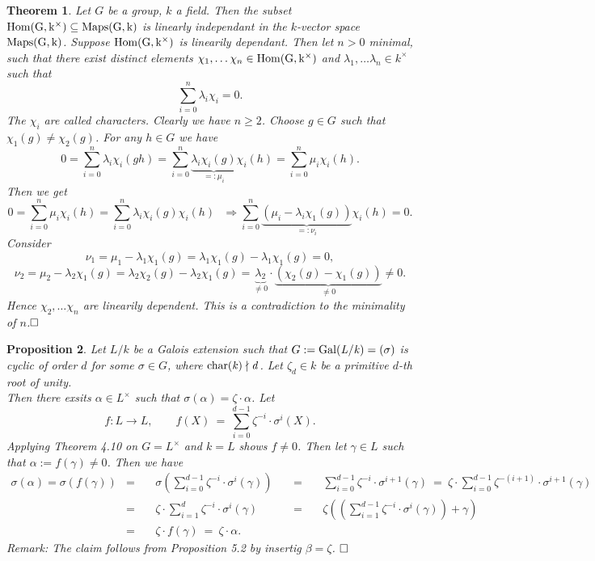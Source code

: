\documentclass[11pt]{book}
\newtheorem{theorem}{Theorem}[section]
\newtheorem{proposition}[theorem]{Proposition}
\theoremstyle{nonumberbreak}
\newenvironment{pr}[1][]{\ifthenelse{\equal{#1}{}}{\proof}{\proof[#1]}\rm}{\endproof}
\begin{document}
\begin{spacing}{1.3}
\begin{theorem} %
Let $G$ be a group, $k$ a field. Then the subset $\rm{Hom}(G,k^{\times}) \subseteq \rm{Maps}(G,k)$ is linearly independant in the $k$-vector space $\rm{Maps}(G,k)$. 
\begin{pr}
Suppose $\rm{Hom}(G,k^{\times})$ is linearily dependant. Then let $n>0$ minimal, such that there exist distinct elements $\chi_1, \dots \chi_n \in \rm{Hom}(G,k^{\times})$ and $\lambda_1, \dots \lambda_n \in k^{\times}$ such that
$$ \sum_{i=0}^n \lambda_i \chi_i =0.$$
The $\chi_i$ are called \textit{characters}. Clearly we have $n \geqslant 2$. Choose $g \in G$ such that $\chi_1(g) \neq \chi_2(g)$.
For any $h \in G$ we have
$$0 = \sum_{i=0}^n \lambda_i \chi_i (gh)= \sum_{i=0}^n \underbrace{\lambda_i \chi_i(g)}_{=:\mu_i} \chi_i(h)=\sum_{i=0}^n \mu_i \chi_i(h).$$
Then we get 
$$0 =\sum_{i=0}^n \mu_i \chi_i(h)= \sum_{i=0}^n \lambda_i \chi_i(g)\chi_i(h) \textrm{ } \Rightarrow \sum_{i=0}^n \underbrace{\left(\mu_i-\lambda_i \chi_1(g)\right)}_{=:\nu_i}\chi_i(h)=0.$$
Consider
$$\nu_1=\mu_1-\lambda_1 \chi_1(g)=\lambda_1 \chi_1(g)-\lambda_1 \chi_1(g)=0,$$
$$\nu_2=\mu_2-\lambda_2 \chi_1(g)=\lambda_2 \chi_2(g)-\lambda_2 \chi_1(g)=\underbrace{\lambda_2}_{\neq 0} \cdot \underbrace{\left(\chi_2(g)-\chi_1(g)\right)}_{\neq 0} \neq 0.$$
Hence $\chi_2, \dots \chi_n$ are linearily dependent. This is a contradiction to the minimality of $n$.$\hfill \Box$
\end{pr}
\end{theorem}


\begin{proposition} %
Let $L/k$ be a Galois extension such that $G:= \rm{Gal}\it(L/k)=( \sigma )$ is cyclic of order $d$ for some $\sigma \in G$, where $\rm{char}\it(k) \nmid d$. Let $\zeta_d \in k$ be a primitive $d$-th root of unity.\\
Then there exsits $\alpha \in L^{\times}$ such that $\sigma(\alpha)=\zeta \cdot \alpha$.
\begin{pr}
Let $$f:L \longrightarrow L, \qquad f(X)\ =\ \sum_{i=0}^{d-1} \zeta^{-i} \cdot \sigma^{i}(X).$$
Applying Theorem 4.10 on $G=L^{\times}$ and $k=L$ shows $f\neq 0$.
Then let $\gamma \in L$ such that $\alpha:=f(\gamma) \neq 0$. Then we have
\begin{alignat*}{13}
\sigma(\alpha)=\sigma \left(f(\gamma)\right) &=&& \ \sigma \left(\sum_{i=0}^{d-1} \zeta^{-i} \cdot \sigma^{i}(\gamma)\right) \ &&=&&\ \sum_{i=0}^{d-1} \zeta^{-i} \cdot \sigma^{i+1}(\gamma)\ =\ \zeta \cdot \sum_{i=0}^{d-1}\zeta^{-(i+1)}\cdot \sigma^{i+1}(\gamma)\\
&= && \ \zeta \cdot \sum_{i=1}^d \zeta^{-i} \cdot \sigma^{i}(\gamma) \ &&= &&\ \zeta \left(\left(\sum_{i=1}^{d-1}\zeta^{-i} \cdot \sigma^{i}(\gamma)\right)+\gamma \right)  \\
&=&&\ \zeta \cdot f(\gamma) \ =\ \zeta \cdot \alpha. 
\end{alignat*}
\textit{Remark:} The claim follows from Proposition 5.2 by insertig $\beta=\zeta$.  $\hfill \Box$
\end{pr}
\end{proposition}


\end{spacing}
\end{document}
